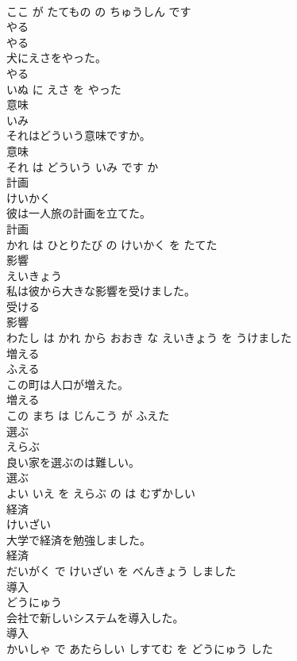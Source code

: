 \documentclass[8pt]{extreport}
\begin{document}
\begin{CJK}{UTF8}{min}
\\	ここ が たてもの の ちゅうしん です			
\\	やる	
\\	やる			
\\	犬にえさをやった。	
\\	やる 
\\	いぬ に えさ を やった			
\\	意味	
\\	いみ			
\\	それはどういう意味ですか。	
\\	意味 
\\	それ は どういう いみ です か			
\\	計画	
\\	けいかく			
\\	彼は一人旅の計画を立てた。	
\\	計画 
\\	かれ は ひとりたび の けいかく を たてた			
\\	影響	
\\	えいきょう			
\\	私は彼から大きな影響を受けました。	
\\	受ける 
\\	影響 
\\	わたし は かれ から おおき な えいきょう を うけました			
\\	増える	
\\	ふえる			
\\	この町は人口が増えた。	
\\	増える 
\\	この まち は じんこう が ふえた			
\\	選ぶ	
\\	えらぶ			
\\	良い家を選ぶのは難しい。	
\\	選ぶ 
\\	よい いえ を えらぶ の は むずかしい			
\\	経済	
\\	けいざい			
\\	大学で経済を勉強しました。	
\\	経済 
\\	だいがく で けいざい を べんきょう しました			
\\	導入	
\\	どうにゅう			
\\	会社で新しいシステムを導入した。	
\\	導入 
\\	かいしゃ で あたらしい しすてむ を どうにゅう した			

\end{CJK}
\end{document}
